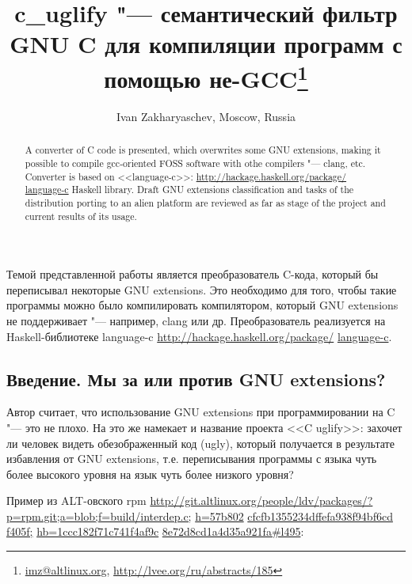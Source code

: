 \documentclass[10pt, a5paper]{article}
\begin{document}
\title{c\_uglify "--- семантический фильтр GNU C для компиляции программ с помощью не-GCC\footnote{\url{imz@altlinux.org}, \url{http://lvee.org/ru/abstracts/185}}}
\author{Ivan Zakharyaschev, Moscow, Russia}
\maketitle
\begin{abstract}
A converter of C code is presented, which overwrites some GNU extensions, making it possible to compile gcc-oriented FOSS software with othe compilers "--- clang, etc. Converter is based on <<language-c>>: \url{http://hackage.haskell.org/package/} \linebreak \url{language-c} Haskell library. Draft GNU extensions classification and tasks of the  distribution porting to an alien platform are reviewed as far as stage of the project and current results of its usage.
\end{abstract}
Темой представленной работы является преобразователь C-кода, который бы переписывал некоторые GNU extensions. Это необходимо для того, чтобы такие программы можно было компилировать компилятором, который GNU extensions не поддерживает "--- например, clang или др. Преобразователь реализуется на Haskell-библиотеке language-c \url{http://hackage.haskell.org/package/} \linebreak \url{language-c}.

\subsection*{Введение. Мы за или против GNU extensions?}

Автор считает, что использование GNU extensions при программировании на C "--- это не плохо. На это же намекает и название проекта <<C uglify>>: захочет ли человек видеть обезображенный код (ugly), который получается в результате избавления от GNU \linebreak extensions, т.е. переписывания программы с языка чуть более высокого уровня на язык чуть более низкого уровня?


Пример из ALT-овского rpm \url{http://git.altlinux.org/people/ldv/packages/?p=rpm.git;a=blob;f=build/interdep.c;} \url{h=57b802} \url{cfcfb1355234dffefa938f94bf6cd} \url{f405f;} \url{hb=1ccc182f71c741f4af9c} \url{8e72d8cd1a4d35a921fa#l495}:

\lstset{ %
language=C,                 %
basicstyle=\small\sffamily, %
breaklines=true,           %
breakatwhitespace=false, %
}
\end{document}
